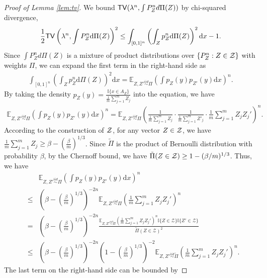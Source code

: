 \begin{proof}[Proof of Lemma \ref{lem:tv}]
We bound ${\sf TV}(\lambda^n,\int P_Z^n d\Pi(Z))$ by chi-squared divergence,
\begin{align*}
    \frac{1}{2}{\sf TV}\left(\lambda^n,\int P_Z^n \mathrm{d}\Pi(Z)\right)^2 \leq \int_{[0,1]^n} \left(\int_Z p_Z^n \mathrm{d}\Pi(Z)\right)^2 \mathrm{d}x -1.
\end{align*}
Since $\int P_Z^n d\Pi(Z)$ is a mixture of product distributions over $\{P_Z^n: Z \in \mathcal{Z}\}$ with weights $\Pi$, we can expand the first term in the right-hand side as
\begin{align*}
    \int_{[0,1]^n} \left(\int_Z p_Z^n \mathrm{d}\Pi(Z)\right)^2 \mathrm{d}x
= \mathbb{E}_{Z,Z'\stackrel{iid}{\sim} \Pi}\left(\int p_Z(y)p_{Z'}(y) \mathrm{d}x\right)^n.
\end{align*}
By taking the density $p_Z(y) = \frac{\mathbb{I}\{x\in A_Z\}}{\frac{1}{m}\sum_{j=1}^mZ_j}$ into the equation, we have
\begin{align*}
    \mathbb{E}_{Z,Z'\stackrel{iid}{\sim} \Pi}\left(\int p_Z(y)p_{Z'}(y) \mathrm{d}x\right)^n
= \mathbb{E}_{Z,Z'\stackrel{iid}{\sim} \Pi}\left(\frac{1}{\frac{1}{m}\sum_{j=1}^mZ_j}\cdot \frac{1}{\frac{1}{m}\sum_{j=1}^mZ'_j}\cdot \frac{1}{m}\sum_{j=1}^mZ_jZ_j'\right)^n.
\end{align*}
According to the construction of $\mathcal{Z}$, for any vector $Z \in \mathcal{Z}$, we have $\frac{1}{m}\sum_{j=1}^mZ_j \geq \beta - \left(\frac{\beta}{m}\right)^{1/3}$. Since $\tilde\Pi$ is the product of Bernoulli distribution with probability $\beta$, by the Chernoff bound, we have $\tilde\Pi(Z \in \mathcal{Z}) \geq 1 - (\beta/m)^{1/3}$. Thus, we have
\begin{eqnarray*}
&&\mathbb{E}_{Z,Z'\stackrel{iid}{\sim} \Pi}\left(\int p_Z(y)p_{Z'}(y) \mathrm{d}x\right)^n\\
&\leq& \left(\beta-\left(\frac{\beta}{m}\right)^{1/3}\right)^{-2n}\mathbb{E}_{Z,Z'\stackrel{iid}{\sim} \Pi}\left(\frac{1}{m}\sum_{j=1}^mZ_jZ_j'\right)^n \\
&=& \left(\beta-\left(\frac{\beta}{m}\right)^{1/3}\right)^{-2n}\frac{\mathbb{E}_{Z,Z'\stackrel{iid}{\sim} \tilde{\Pi}}\left(\frac{1}{m}\sum_{j=1}^mZ_jZ_j'\right)^n\mathbb{I}\{Z\in\mathcal{Z}\}\mathbb{I}\{Z'\in\mathcal{Z}\}}{\tilde{\Pi}(Z\in \mathcal{Z})^2} \\
&\leq& \left(\beta-\left(\frac{\beta}{m}\right)^{1/3}\right)^{-2n}\left(1-\left(\frac{\beta}{m}\right)^{1/3}\right)^{-2}\mathbb{E}_{Z,Z'\stackrel{iid}{\sim} \tilde{\Pi}}\left(\frac{1}{m}\sum_{j=1}^mZ_jZ_j'\right)^n.
\end{eqnarray*}
The last term on the right-hand side can be bounded by

\end{proof}
